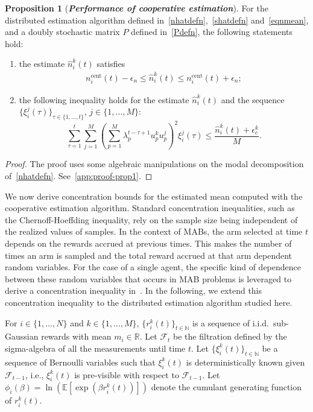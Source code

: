 \documentclass[final,5p,times,twocolumn]{elsarticle}
\theoremstyle{definition}
\newtheorem{proposition}{Proposition}
\def \mc {\mathcal}
\def\real{\mathbb{R}}
\def\naturals{\mathbb{N}}
\newcommand{\until}[1]{\{1,\dots, #1\}}
\newcommand{\seqdef}[2]{\{#1\}_{#2}}
\newcommand{\lnn}[1]{%
	\ln  \left(#1\right)%
}
\newcommand{\expp}[1]{%
	\exp \! \left(#1\right)%
}
\newcommand\bit[1]{\textit{\textbf{#1}}}
\begin{document}
\begin{proposition}[\bit{Performance of cooperative estimation}]\label{prop:coop-est}
For the distributed estimation algorithm defined in~\eqref{nhatdefn},~\eqref{shatdefn} and~\eqref{eqnmean}, and a doubly stochastic matrix $P$ defined in~\eqref{Pdefn}, the following statements hold:
\begin{enumerate}
\item the estimate $\hat n_i^k(t)$ satisfies
\begin{align*}
n_i^{\text{cent}}(t) - \epsilon_n \le  \hat{n}_i^k(t) \le   n_i^{\text{cent}}(t) + \epsilon_n;
\end{align*}
\item the following inequality holds for the estimate   $\hat {n}_i^k(t)$ and the sequence $\seqdef{\xi_i^j(\tau)}{\tau\in \until{t}}$, $ j \in \until{M}$:
\begin{equation*}
\sum_{\tau=1}^{t} \sum_{j=1}^M \left(\sum_{p=1}^M \lambda_p^{t-\tau+1}  u_p^k u_p^j  \right)^2 \xi_i^j(\tau) \leq \frac{ \hat n_i^k(t) + \epsilon_c^k}{M}.
\end{equation*}
\end{enumerate}
\end{proposition}
\begin{proof}
The proof uses some algebraic manipulations on the modal decomposition of~\eqref{nhatdefn}.  See~\ref{app:proof-prop1}. 
\end{proof}

We now  derive concentration bounds for the estimated mean computed with the cooperative estimation algorithm. Standard concentration inequalities, such as the Chernoff-Hoeffding inequality, rely on the sample size being independent of the realized values of samples. In the context of MABs, the arm selected at time $t$ depends on the rewards accrued at previous times. This makes the number of times an arm is sampled and the total reward accrued at that arm dependent random variables. For the case of a single agent, the specific kind of dependence between these random variables that occurs in MAB problems is leveraged to derive  a concentration inequality  in~\cite{AG-EM:08}.  In the following, we extend this concentration inequality to the distributed estimation algorithm studied here. 

For $i\in \{1,\dots,N\}$ and $k\in \{1,\dots,M\}$, $\seqdef{r_i^k(t)}{t \in \naturals}$  is a sequence of i.i.d.~sub-Gaussian {rewards} with mean $m_i \in \real$.   Let $\mathcal{F}_t$ be the filtration defined by the sigma-algebra of all the measurements until time $t$. Let $\seqdef{\xi_i^k(t)}{t \in \naturals}$  be a sequence of Bernoulli variables such that $\xi_i^k(t)$ is deterministically known given $\mc F_{t-1}$, i.e., $\xi_i^k(t)$ is pre-visible with respect to $\mc F_{t-1}$.
Let $\phi_i(\beta) = \lnn{\mathbb{E}\left[\expp{\beta r_i^k(t)}\right]}$ denote the cumulant generating function of $r_i^k(t)$.  
\end{document}
